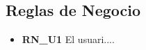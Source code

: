 \subsection{Reglas de Negocio}

\begin{itemize}
\item \textbf{RN\_U1} El usuari.... %

\end{itemize}
